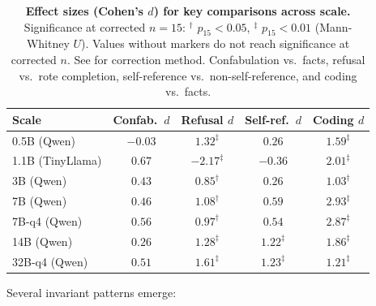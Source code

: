 \documentclass[11pt,a4paper]{article}
\begin{document}
\begin{table}[H]
\centering
\caption{\textbf{Effect sizes (Cohen's $d$) for key comparisons across scale.} Significance at corrected $n = 15$: $^{\dagger}$ $p_{15} < 0.05$, $^{\ddagger}$ $p_{15} < 0.01$ (Mann-Whitney $U$). Values without markers do not reach significance at corrected $n$. See  for correction method. Confabulation vs.\ facts, refusal vs.\ rote completion, self-reference vs.\ non-self-reference, and coding vs.\ facts.}
\label{tab:effect_sizes}
\begin{tabular}{lcccc}
\toprule
\textbf{Scale} & \textbf{Confab.\ $d$} & \textbf{Refusal $d$} & \textbf{Self-ref.\ $d$} & \textbf{Coding $d$} \\
\midrule
0.5B (Qwen) & $-0.03$ & $1.32^{\ddagger}$ & $0.26$ & $1.59^{\ddagger}$ \\
1.1B (TinyLlama) & $0.67$ & $-2.17^{\ddagger}$ & $-0.36$ & $2.01^{\ddagger}$ \\
3B (Qwen) & $0.43$ & $0.85^{\dagger}$ & $0.26$ & $1.03^{\dagger}$ \\
7B (Qwen) & $0.46$ & $1.08^{\dagger}$ & $0.59$ & $2.93^{\ddagger}$ \\
7B-q4 (Qwen) & $0.56$ & $0.97^{\dagger}$ & $0.54$ & $2.87^{\ddagger}$ \\
14B (Qwen) & $0.26$ & $1.28^{\ddagger}$ & $1.22^{\ddagger}$ & $1.86^{\ddagger}$ \\
32B-q4 (Qwen) & $0.51$ & $1.61^{\ddagger}$ & $1.23^{\ddagger}$ & $1.21^{\ddagger}$ \\
\bottomrule
\end{tabular}
\end{table}

Several invariant patterns emerge:
\end{document}
